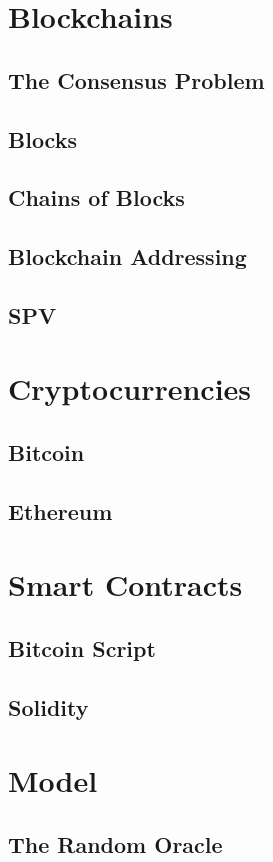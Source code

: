 \section{Blockchains}
\subsection{The Consensus Problem}
\subsection{Blocks}
\subsection{Chains of Blocks}
\subsection{Blockchain Addressing}
\subsection{SPV}

\section{Cryptocurrencies}
\subsection{Bitcoin}
\subsection{Ethereum}

\section{Smart Contracts}
\subsection{Bitcoin Script}
\subsection{Solidity}

\section{Model}
\subsection{The Random Oracle}
